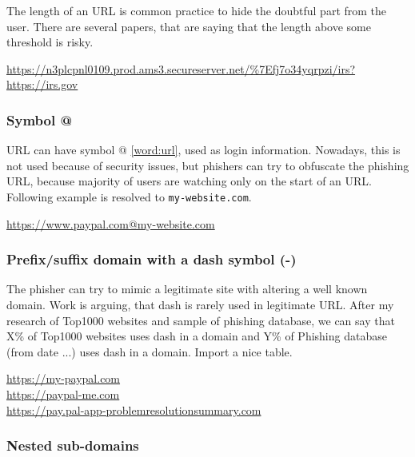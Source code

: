 \documentclass[
  digital, %
  oneside, %
  table,   %
  nolof,     %
  nolot,     %
]{fithesis3}
\newcounter{feature}
\newenvironment{feature}[1]{\stepcounter{feature}%
    \tcolorbox[beamer,%
    noparskip,breakable,
    colback=LightBlue,colframe=DarkBlue,%
    colbacklower=DarkBlue!75!LightBlue,%
    title=Feature~\thefeature: #1]}%
    {\endtcolorbox}
\begin{document}
The length of an URL is common practice to hide the doubtful part from the user. There are several papers, that are saying that the length above some threshold is risky. \cite{find the paper}

\begin{feature}{Long URL}
\url{https://n3plcpnl0109.prod.ams3.secureserver.net/\%7Efj7o34yqrpzi/irs?https://irs.gov}
\end{feature}

\subsubsection{Symbol @ \cite{url-features-work} \cite{cantina} \cite{fresh-phish}}


URL can have symbol @ \ref{word:url}, used as login information. Nowadays, this is not used because of security issues, but phishers can try to obfuscate the phishing URL, because majority of users are watching only on the start of an URL. Following example is resolved to \texttt{my-website.com}.

\begin{feature}{Symbol @}
\url{https://www.paypal.com@my-website.com}
\end{feature}

\subsubsection{Prefix/suffix domain with a dash symbol (-) \cite{url-features-work} \cite{new-method-for-detection}
\cite{fresh-phish}} 
\label{url-feature:prefix}

The phisher can try to mimic a legitimate site with altering a well known domain. Work \cite{url-features-work} is arguing, that dash is rarely used in legitimate URL. After my research of Top1000 websites and sample of phishing database, we can say that X\% of Top1000 websites uses dash in a domain and Y\% of Phishing database (from date ...) uses dash in a domain. Import a nice table.

\begin{feature}{Prefix/suffix domain with a dash symbol (-)}
\url{https://my-paypal.com} \\
\url{https://paypal-me.com} \\
\url{https://pay.pal-app-problemresolutionsummary.com}
\end{feature}

\subsubsection{Nested sub-domains \cite{url-features-work} \cite{cantina} \cite{new-method-for-detection}
\cite{fresh-phish}}
\end{document}
